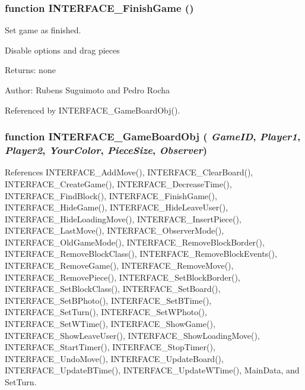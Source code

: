 \subsubsection[INTERFACE\_\-FinishGame]{\setlength{\rightskip}{0pt plus 5cm}function INTERFACE\_\-FinishGame ()}\label{interface_2game_8js_098eb8b58412b41f182325209a957d12}


Set game as finished. 

Disable options and drag pieces

\begin{Desc}
\item[Returns:]none \end{Desc}
\begin{Desc}
\item[Author:]Rubens Suguimoto and Pedro Rocha \end{Desc}


Referenced by INTERFACE\_\-GameBoardObj().
\subsubsection[INTERFACE\_\-GameBoardObj]{\setlength{\rightskip}{0pt plus 5cm}function INTERFACE\_\-GameBoardObj ( {\em GameID}, \/   {\em Player1}, \/   {\em Player2}, \/   {\em YourColor}, \/   {\em PieceSize}, \/   {\em Observer})}\label{interface_2game_8js_5dd15702c41e1c3f77182e5c23f1beb3}




References INTERFACE\_\-AddMove(), INTERFACE\_\-ClearBoard(), INTERFACE\_\-CreateGame(), INTERFACE\_\-DecreaseTime(), INTERFACE\_\-FindBlock(), INTERFACE\_\-FinishGame(), INTERFACE\_\-HideGame(), INTERFACE\_\-HideLeaveUser(), INTERFACE\_\-HideLoadingMove(), INTERFACE\_\-InsertPiece(), INTERFACE\_\-LastMove(), INTERFACE\_\-ObserverMode(), INTERFACE\_\-OldGameMode(), INTERFACE\_\-RemoveBlockBorder(), INTERFACE\_\-RemoveBlockClass(), INTERFACE\_\-RemoveBlockEvents(), INTERFACE\_\-RemoveGame(), INTERFACE\_\-RemoveMove(), INTERFACE\_\-RemovePiece(), INTERFACE\_\-SetBlockBorder(), INTERFACE\_\-SetBlockClass(), INTERFACE\_\-SetBoard(), INTERFACE\_\-SetBPhoto(), INTERFACE\_\-SetBTime(), INTERFACE\_\-SetTurn(), INTERFACE\_\-SetWPhoto(), INTERFACE\_\-SetWTime(), INTERFACE\_\-ShowGame(), INTERFACE\_\-ShowLeaveUser(), INTERFACE\_\-ShowLoadingMove(), INTERFACE\_\-StartTimer(), INTERFACE\_\-StopTimer(), INTERFACE\_\-UndoMove(), INTERFACE\_\-UpdateBoard(), INTERFACE\_\-UpdateBTime(), INTERFACE\_\-UpdateWTime(), MainData, and SetTurn.

